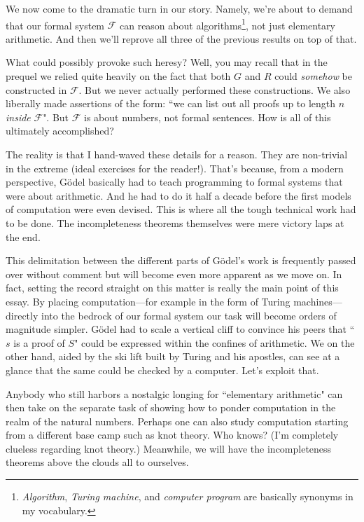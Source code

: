 \documentclass{article}
\theoremstyle{theorem}
\begin{document}
We now come to the dramatic turn in our story. Namely, we're about to demand that our formal system $\mathcal{F}$ can reason about algorithms\footnote{\textit{Algorithm}, \textit{Turing machine}, and \textit{computer program} are basically synonyms in my vocabulary.}, not just elementary arithmetic. And then we'll reprove all three of the previous results on top of that.

What could possibly provoke such heresy? Well, you may recall that in the prequel we relied quite heavily on the fact that both $G$ and $R$ could \textit{somehow} be constructed in $\mathcal{F}$. But we never actually performed these constructions. We also liberally made assertions of the form: ``we can list out all proofs up to length $n$ \textit{inside} $\mathcal{F}$". But $\mathcal{F}$ is about numbers, not formal sentences. How is all of this ultimately accomplished?

The reality is that I hand-waved these details for a reason. They are non-trivial in the extreme (ideal exercises for the reader!). That's because, from a modern perspective, Gödel basically had to teach programming to formal systems that were about arithmetic. And he had to do it half a decade before the first models of computation were even devised. This is where all the tough technical work had to be done. The incompleteness theorems themselves were mere victory laps at the end.

This delimitation between the different parts of Gödel's work is frequently passed over without comment but will become even more apparent as we move on. In fact, setting the record straight on this matter is really the main point of this essay. By placing computation---for example in the form of Turing machines---directly into the bedrock of our formal system our task will become orders of magnitude simpler. Gödel had to scale a vertical cliff to convince his peers that ``$s$ is a proof of $S$" could be expressed within the confines of arithmetic. We on the other hand, aided by the ski lift built by Turing and his apostles, can see at a glance that the same could be checked by a computer. Let's exploit that.

Anybody who still harbors a nostalgic longing for ``elementary arithmetic" can then take on the separate task of showing how to ponder computation in the realm of the natural numbers. Perhaps one can also study computation starting from a different base camp such as knot theory. Who knows? (I'm completely clueless regarding knot theory.) Meanwhile, we will have the incompleteness theorems above the clouds all to ourselves.
\end{document}
